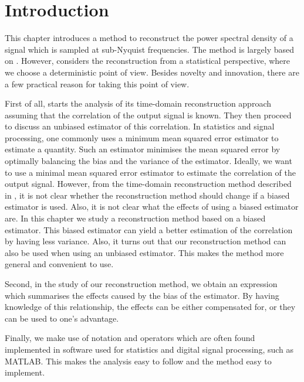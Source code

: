 \documentclass[a4paper, openany, oneside]{memoir}
\begin{document}
\section{Introduction}
This chapter introduces a method to reconstruct the power spectral density of a signal which is sampled at sub-Nyquist frequencies. The method is largely based on \cite{ariananda2012compressive}. However, \cite{ariananda2012compressive} considers the reconstruction from a statistical perspective, where we choose a deterministic point of view. Besides novelty and innovation, there are a few practical reason for taking this point of view.

First of all, \cite{ariananda2012compressive} starts the analysis of its time-domain reconstruction approach assuming that the correlation of the output signal is known. They then proceed to discuss an unbiased estimator of this correlation. In statistics and signal processing, one commonly uses a minimum mean squared error estimator to estimate a quantity. Such an estimator minimises the mean squared error by optimally balancing the bias and the variance of the estimator. Ideally, we want to use a minimal mean squared error estimator to estimate the correlation of the output signal. However, from the time-domain reconstruction method described in \cite{ariananda2012compressive}, it is not clear whether the reconstruction method should change if a biased estimator is used. Also, it is not clear what the effects of using a biased estimator are. In this chapter we study a reconstruction method based on a biased estimator. This biased estimator can yield a better estimation of the correlation by having less variance. Also, it turns out that our reconstruction method can also be used when using an unbiased estimator. This makes the method more general and convenient to use.

Second, in the study of our reconstruction method, we obtain an expression which summarises the effects caused by the bias of the estimator. By having knowledge of this relationship, the effects can be either compensated for, or they can be used to one's advantage.

Finally, we make use of notation and operators which are often found implemented in software used for statistics and digital signal processing, such as MATLAB. This makes the analysis easy to follow and the method easy to implement.
\end{document}
